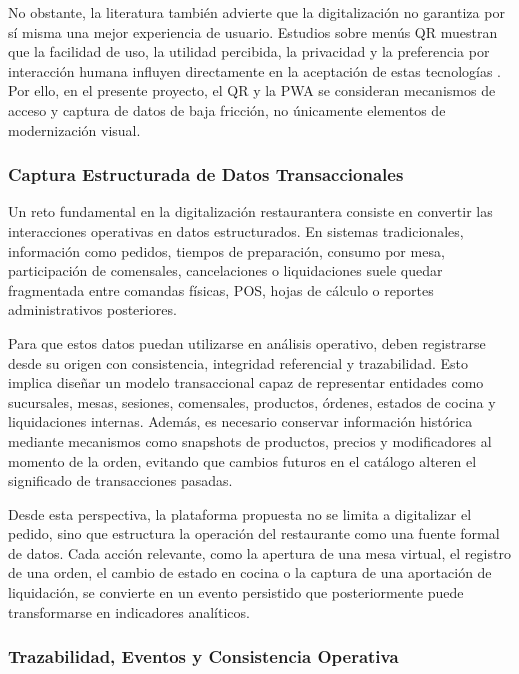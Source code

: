 No obstante, la literatura tambi\'en advierte que la digitalizaci\'on no garantiza por s\'i
misma una mejor experiencia de usuario. Estudios sobre men\'us QR muestran que la
facilidad de uso, la utilidad percibida, la privacidad y la preferencia por interacci\'on
humana influyen directamente en la aceptaci\'on de estas tecnolog\'ias
\cite{koay_qr_2024, hewage_qr_2024, yigitoglu_sustainable_2025}. Por ello, en el
presente proyecto, el QR y la PWA se consideran mecanismos de acceso y captura de datos
de baja fricci\'on, no \'unicamente elementos de modernizaci\'on visual.

\subsubsection{Captura Estructurada de Datos Transaccionales}

Un reto fundamental en la digitalizaci\'on restaurantera consiste en convertir las
interacciones operativas en datos estructurados. En sistemas tradicionales, informaci\'on
como pedidos, tiempos de preparaci\'on, consumo por mesa, participaci\'on de comensales,
cancelaciones o liquidaciones suele quedar fragmentada entre comandas f\'isicas, POS,
hojas de c\'alculo o reportes administrativos posteriores.

Para que estos datos puedan utilizarse en an\'alisis operativo, deben registrarse desde
su origen con consistencia, integridad referencial y trazabilidad. Esto implica dise\~nar
un modelo transaccional capaz de representar entidades como sucursales, mesas, sesiones,
comensales, productos, \'ordenes, estados de cocina y liquidaciones internas. Adem\'as,
es necesario conservar informaci\'on hist\'orica mediante mecanismos como snapshots de
productos, precios y modificadores al momento de la orden, evitando que cambios futuros
en el cat\'alogo alteren el significado de transacciones pasadas.

Desde esta perspectiva, la plataforma propuesta no se limita a digitalizar el pedido,
sino que estructura la operaci\'on del restaurante como una fuente formal de datos. Cada
acci\'on relevante, como la apertura de una mesa virtual, el registro de una orden, el
cambio de estado en cocina o la captura de una aportaci\'on de liquidaci\'on, se convierte
en un evento persistido que posteriormente puede transformarse en indicadores anal\'iticos.

\subsubsection{Trazabilidad, Eventos y Consistencia Operativa}

